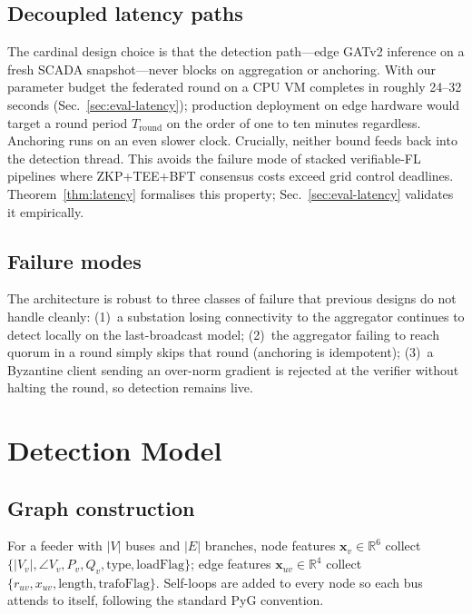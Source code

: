 \documentclass[conference]{IEEEtran}
\begin{document}
\subsection{Decoupled latency paths}
\label{sec:decouple}
The cardinal design choice is that the detection path---edge GATv2 inference on a fresh SCADA snapshot---never blocks on aggregation or anchoring. With our parameter budget the federated round on a CPU VM completes in roughly 24--32 seconds (Sec.~\ref{sec:eval-latency}); production deployment on edge hardware would target a round period $T_{\mathrm{round}}$ on the order of one to ten minutes regardless. Anchoring runs on an even slower clock. Crucially, neither bound feeds back into the detection thread. This avoids the failure mode of stacked verifiable-FL pipelines where ZKP+TEE+BFT consensus costs exceed grid control deadlines. Theorem~\ref{thm:latency} formalises this property; Sec.~\ref{sec:eval-latency} validates it empirically.

\subsection{Failure modes}
The architecture is robust to three classes of failure that previous designs do not handle cleanly: (1)~a substation losing connectivity to the aggregator continues to detect locally on the last-broadcast model; (2)~the aggregator failing to reach quorum in a round simply skips that round (anchoring is idempotent); (3)~a Byzantine client sending an over-norm gradient is rejected at the verifier without halting the round, so detection remains live.

\section{Detection Model}
\label{sec:detect}
\subsection{Graph construction}
For a feeder with $|V|$ buses and $|E|$ branches, node features $\mathbf{x}_v \in \mathbb{R}^{6}$ collect $\{|V_v|,\angle V_v, P_v, Q_v, \mathrm{type}, \mathrm{loadFlag}\}$; edge features $\mathbf{x}_{uv}\in\mathbb{R}^{4}$ collect $\{r_{uv}, x_{uv}, \mathrm{length}, \mathrm{trafoFlag}\}$. Self-loops are added to every node so each bus attends to itself, following the standard PyG convention.
\end{document}
